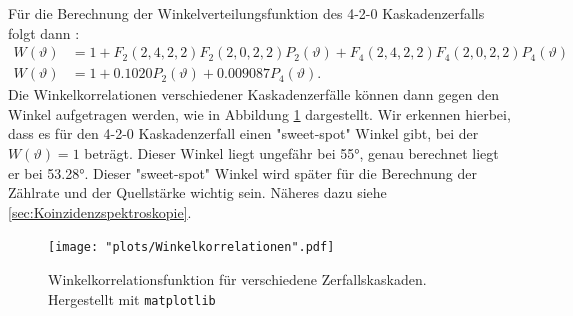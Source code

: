 \documentclass[%
aps,
onecolumn,
11pt,
tightenlines,
nofootinbib,
superscriptaddress,
floatfix,
prd,
]{revtex4-2}
\begin{document}
Für die Berechnung der Winkelverteilungsfunktion des 4-2-0 Kaskadenzerfalls folgt dann \cite{manual1}:
\begin{align}
	W(\vartheta) &= 1 + F_2(2,4,2,2)F_2(2,0,2,2)P_2(\vartheta) + F_4(2,4,2,2)F_4(2,0,2,2)P_4(\vartheta) \\
	W(\vartheta) &= 1 + 0.1020 P_2(\vartheta) + 0.009087 P_4(\vartheta). \nonumber
\end{align}
Die Winkelkorrelationen verschiedener Kaskadenzerfälle können dann gegen den Winkel aufgetragen werden, wie in Abbildung \ref{fig:angularcorrelation} dargestellt. Wir erkennen hierbei, dass es für den 4-2-0 Kaskadenzerfall einen "sweet-spot" Winkel gibt, bei der $W(\vartheta)=1$ beträgt. Dieser Winkel liegt ungefähr bei 55°, genau berechnet liegt er bei 53.28°. Dieser "sweet-spot" Winkel wird später für die Berechnung der Zählrate und der Quellstärke wichtig sein. Näheres dazu siehe \ref{sec:Koinzidenzspektroskopie}.
\begin{figure}[ht]
		\texttt{[image: "plots/Winkelkorrelationen".pdf]}
	\caption{Winkelkorrelationsfunktion für verschiedene Zerfallskaskaden. Hergestellt mit \texttt{matplotlib}}
	\label{fig:angularcorrelation}
\end{figure}
\end{document}
